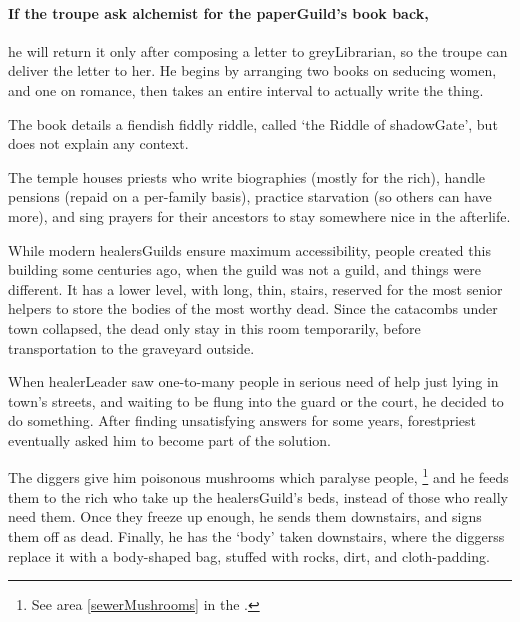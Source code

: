 \begin{multicols}{2}
\paragraph{If the troupe ask \gls{alchemist} for the \gls{paperGuild}'s book back,}
he will return it only after composing a letter to \gls{greyLibrarian}, so the troupe can deliver the letter to her.
He begins by arranging two books on seducing women, and one on romance, then takes an entire \gls{interval} to actually write the thing. 

The book details a fiendish fiddly riddle, called `the Riddle of \gls{shadowGate}', but does not explain any context.


\label{hardestRiddle}
\hardestRiddleEver



The temple houses priests who write biographies (mostly for the rich), handle pensions (repaid on a per-family basis), practice starvation (so others can have more), and sing prayers for their ancestors to stay somewhere nice in the afterlife.

While modern \glspl{healersGuild} ensure maximum accessibility, people created this building some centuries ago, when the guild was not a guild, and things were different.
It has a lower level, with long, thin, stairs, reserved for the most senior \glspl{helper} to store the bodies of the most worthy dead.
Since the catacombs under \gls{town} collapsed, the dead only stay in this room temporarily, before transportation to the graveyard outside.

\begin{exampletext}
  When \gls{healerLeader} saw one-to-many people in serious need of help just lying in \gls{town}'s streets, and waiting to be flung into the \gls{guard} or the \gls{court}, he decided to do something.
  After finding unsatisfying answers for some years, \gls{forestpriest} eventually asked him to become part of the solution.

  The \gls{diggers} give him poisonous mushrooms which paralyse people,
  \footnote{See area \vref{sewerMushrooms} in the .}
  and he feeds them to the rich who take up the \gls{healersGuild}'s beds, instead of those who really need them.
  Once they freeze up enough, he sends them downstairs, and signs them off as dead.
  Finally, he has the `body' taken downstairs, where the \glspl{diggers} replace it with a body-shaped bag, stuffed with rocks, dirt, and cloth-padding.
\end{exampletext}


\end{multicols}
